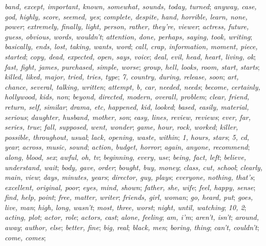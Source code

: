 \begingroup\small\raggedright\sloppy
\textit{band, except, important, known, somewhat, sounds, today, turned};
\textit{anyway, case, god, highly, score, seemed, yes};
\textit{complete, despite, hand, horrible, learn, none, power};
\textit{extremely, finally, light, person, rather, they're, viewer};
\textit{actress, future, guess, obvious, words, wouldn't};
\textit{attention, done, perhaps, saying, took, writing};
\textit{basically, ends, lost, taking, wants, word};
\textit{call, crap, information, moment, piece, started};
\textit{copy, dead, expected, open, says, voice};
\textit{deal, evil, head, heart, living, ok};
\textit{fast, fight, james, purchased, simple, worse};
\textit{group, hell, looks, room, start, starts};
\textit{killed, liked, major, tried, tries, type};
\textit{7, country, during, release, soon};
\textit{art, chance, several, talking, written};
\textit{attempt, b, car, needed, needs};
\textit{become, certainly, hollywood, kids, non};
\textit{beyond, directed, modern, overall, problem};
\textit{clear, friend, return, self, similar};
\textit{drama, etc, happened, kid, looked};
\textit{based, easily, material, serious};
\textit{daughter, husband, mother, son};
\textit{easy, lines, review, reviews};
\textit{ever, far, series, true};
\textit{fall, supposed, went, wonder};
\textit{game, hour, rock, worked};
\textit{killer, possible, throughout, usual};
\textit{lack, opening, waste, within};
\textit{1, hours, stars};
\textit{5, cd, year};
\textit{across, music, sound};
\textit{action, budget, horror};
\textit{again, anyone, recommend};
\textit{along, blood, sex};
\textit{awful, oh, tv};
\textit{beginning, every, use};
\textit{being, fact, left};
\textit{believe, understand, wait};
\textit{body, gave, order};
\textit{bought, buy, money};
\textit{class, cut, school};
\textit{clearly, main, view};
\textit{days, minutes, years};
\textit{director, guy, plays};
\textit{everyone, nothing, that's};
\textit{excellent, original, poor};
\textit{eyes, mind, shown};
\textit{father, she, wife};
\textit{feel, happy, sense};
\textit{find, help, point};
\textit{free, matter, writer};
\textit{friends, girl, woman};
\textit{go, heard, put};
\textit{goes, live, man};
\textit{high, long, wasn't};
\textit{most, three, worst};
\textit{night, until, watching};
\textit{10, 2};
\textit{acting, plot};
\textit{actor, role};
\textit{actors, cast};
\textit{alone, feeling};
\textit{am, i'm};
\textit{aren't, isn't};
\textit{around, away};
\textit{author, else};
\textit{better, fine};
\textit{big, real};
\textit{black, men};
\textit{boring, thing};
\textit{can't, couldn't};
\textit{come, comes};
